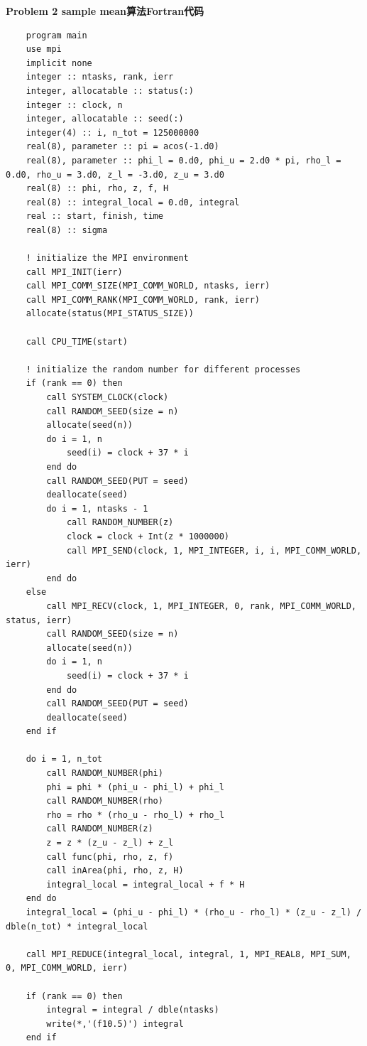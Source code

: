 \documentclass[UTF8,10pt,a4paper]{article}
\theoremstyle{Problem}
\theoremstyle{Solution}
\begin{document}
\textbf{Problem 2 sample mean算法Fortran代码}
\begin{lstlisting}
    program main
    use mpi
    implicit none
    integer :: ntasks, rank, ierr
    integer, allocatable :: status(:)
    integer :: clock, n
    integer, allocatable :: seed(:)
    integer(4) :: i, n_tot = 125000000
    real(8), parameter :: pi = acos(-1.d0)
    real(8), parameter :: phi_l = 0.d0, phi_u = 2.d0 * pi, rho_l = 0.d0, rho_u = 3.d0, z_l = -3.d0, z_u = 3.d0
    real(8) :: phi, rho, z, f, H
    real(8) :: integral_local = 0.d0, integral
    real :: start, finish, time
    real(8) :: sigma

    ! initialize the MPI environment
    call MPI_INIT(ierr)
    call MPI_COMM_SIZE(MPI_COMM_WORLD, ntasks, ierr)
    call MPI_COMM_RANK(MPI_COMM_WORLD, rank, ierr)
    allocate(status(MPI_STATUS_SIZE))

    call CPU_TIME(start)

    ! initialize the random number for different processes
    if (rank == 0) then
        call SYSTEM_CLOCK(clock)
        call RANDOM_SEED(size = n)
        allocate(seed(n))
        do i = 1, n
            seed(i) = clock + 37 * i
        end do
        call RANDOM_SEED(PUT = seed)
        deallocate(seed)
        do i = 1, ntasks - 1
            call RANDOM_NUMBER(z)
            clock = clock + Int(z * 1000000)
            call MPI_SEND(clock, 1, MPI_INTEGER, i, i, MPI_COMM_WORLD, ierr)
        end do
    else
        call MPI_RECV(clock, 1, MPI_INTEGER, 0, rank, MPI_COMM_WORLD, status, ierr)
        call RANDOM_SEED(size = n)
        allocate(seed(n))
        do i = 1, n
            seed(i) = clock + 37 * i
        end do
        call RANDOM_SEED(PUT = seed)
        deallocate(seed)
    end if

    do i = 1, n_tot
        call RANDOM_NUMBER(phi)
        phi = phi * (phi_u - phi_l) + phi_l
        call RANDOM_NUMBER(rho)
        rho = rho * (rho_u - rho_l) + rho_l
        call RANDOM_NUMBER(z)
        z = z * (z_u - z_l) + z_l
        call func(phi, rho, z, f)
        call inArea(phi, rho, z, H)
        integral_local = integral_local + f * H
    end do
    integral_local = (phi_u - phi_l) * (rho_u - rho_l) * (z_u - z_l) / dble(n_tot) * integral_local

    call MPI_REDUCE(integral_local, integral, 1, MPI_REAL8, MPI_SUM, 0, MPI_COMM_WORLD, ierr)

    if (rank == 0) then
        integral = integral / dble(ntasks)
        write(*,'(f10.5)') integral
    end if


\end{lstlisting}
\end{document}
